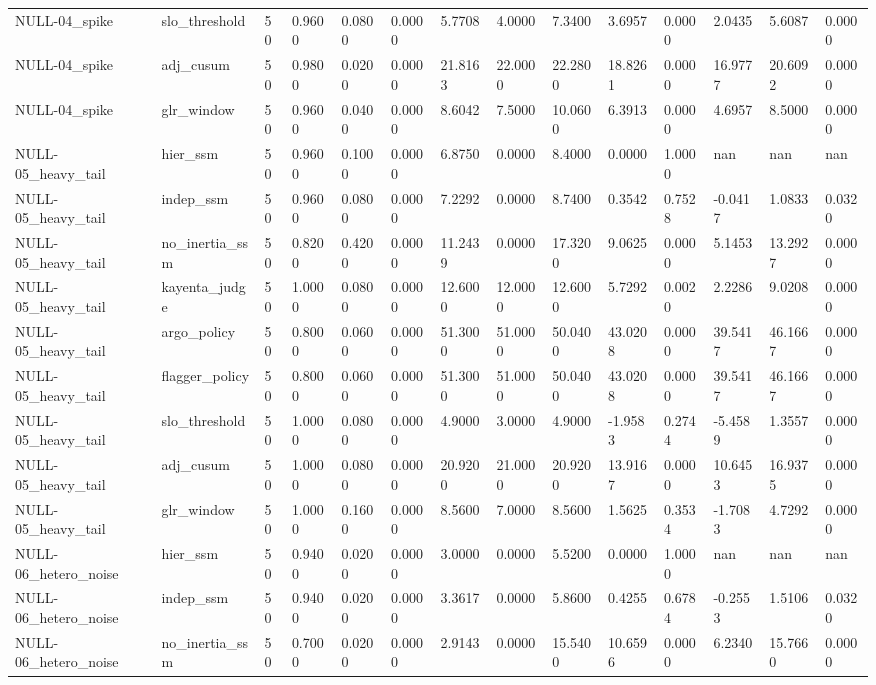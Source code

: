 \begin{table}[htbp]
\begin{tabular}{llllllllllllll}
NULL-04\_spike & slo\_threshold & 50 & 0.9600 & 0.0800 & 0.0000 & 5.7708 & 4.0000 & 7.3400 & 3.6957 & 0.0000 & 2.0435 & 5.6087 & 0.0000 \\
NULL-04\_spike & adj\_cusum & 50 & 0.9800 & 0.0200 & 0.0000 & 21.8163 & 22.0000 & 22.2800 & 18.8261 & 0.0000 & 16.9777 & 20.6092 & 0.0000 \\
NULL-04\_spike & glr\_window & 50 & 0.9600 & 0.0400 & 0.0000 & 8.6042 & 7.5000 & 10.0600 & 6.3913 & 0.0000 & 4.6957 & 8.5000 & 0.0000 \\
NULL-05\_heavy\_tail & hier\_ssm & 50 & 0.9600 & 0.1000 & 0.0000 & 6.8750 & 0.0000 & 8.4000 & 0.0000 & 1.0000 & nan & nan & nan \\
NULL-05\_heavy\_tail & indep\_ssm & 50 & 0.9600 & 0.0800 & 0.0000 & 7.2292 & 0.0000 & 8.7400 & 0.3542 & 0.7528 & -0.0417 & 1.0833 & 0.0320 \\
NULL-05\_heavy\_tail & no\_inertia\_ssm & 50 & 0.8200 & 0.4200 & 0.0000 & 11.2439 & 0.0000 & 17.3200 & 9.0625 & 0.0000 & 5.1453 & 13.2927 & 0.0000 \\
NULL-05\_heavy\_tail & kayenta\_judge & 50 & 1.0000 & 0.0800 & 0.0000 & 12.6000 & 12.0000 & 12.6000 & 5.7292 & 0.0020 & 2.2286 & 9.0208 & 0.0000 \\
NULL-05\_heavy\_tail & argo\_policy & 50 & 0.8000 & 0.0600 & 0.0000 & 51.3000 & 51.0000 & 50.0400 & 43.0208 & 0.0000 & 39.5417 & 46.1667 & 0.0000 \\
NULL-05\_heavy\_tail & flagger\_policy & 50 & 0.8000 & 0.0600 & 0.0000 & 51.3000 & 51.0000 & 50.0400 & 43.0208 & 0.0000 & 39.5417 & 46.1667 & 0.0000 \\
NULL-05\_heavy\_tail & slo\_threshold & 50 & 1.0000 & 0.0800 & 0.0000 & 4.9000 & 3.0000 & 4.9000 & -1.9583 & 0.2744 & -5.4589 & 1.3557 & 0.0000 \\
NULL-05\_heavy\_tail & adj\_cusum & 50 & 1.0000 & 0.0800 & 0.0000 & 20.9200 & 21.0000 & 20.9200 & 13.9167 & 0.0000 & 10.6453 & 16.9375 & 0.0000 \\
NULL-05\_heavy\_tail & glr\_window & 50 & 1.0000 & 0.1600 & 0.0000 & 8.5600 & 7.0000 & 8.5600 & 1.5625 & 0.3534 & -1.7083 & 4.7292 & 0.0000 \\
NULL-06\_hetero\_noise & hier\_ssm & 50 & 0.9400 & 0.0200 & 0.0000 & 3.0000 & 0.0000 & 5.5200 & 0.0000 & 1.0000 & nan & nan & nan \\
NULL-06\_hetero\_noise & indep\_ssm & 50 & 0.9400 & 0.0200 & 0.0000 & 3.3617 & 0.0000 & 5.8600 & 0.4255 & 0.6784 & -0.2553 & 1.5106 & 0.0320 \\
NULL-06\_hetero\_noise & no\_inertia\_ssm & 50 & 0.7000 & 0.0200 & 0.0000 & 2.9143 & 0.0000 & 15.5400 & 10.6596 & 0.0000 & 6.2340 & 15.7660 & 0.0000 \\

\end{tabular}
\end{table}
